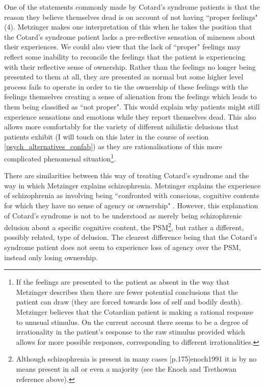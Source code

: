 One of the statements commonly made by Cotard's syndrome patients is that the reason they believe themselves dead is on account of not having ``proper feelings" (4). Metzinger makes one interpretation of this when he takes the position that the Cotard's syndrome patient lacks a pre-reflective sensation of mineness about their experiences. We could also view that the lack of ``proper" feelings may reflect some inability to reconcile the feelings that the patient is experiencing with their reflective sense of ownership. Rather than the feelings no longer being presented to them at all, they are presented as normal but some higher level process fails to operate in order to tie the ownership of these feelings with the feelings themselves creating a sense of alienation from the feelings which leads to them being classified as ``not proper". This would explain why patients might still experience sensations and emotions while they report themselves dead. This also allows more comfortably for the variety of different nihilistic delusions that patients exhibit (I will touch on this later in the course of section \ref{psych_alternatives_confab}) as they are rationalisations of this more complicated phenomenal situation\footnote{If the feelings are presented to the patient as absent in the way that Metzinger describes then there are fewer potential conclusions that the patient can draw (they are forced towards loss of self and bodily death). Metzinger believes that the Cotardian patient is making a rational response to unusual stimulus. On the current account there seems to be a degree of irrationality in the patient's response to the raw stimulus provided which allows for more possible responses, corresponding to different irrationalities.}.

There are similarities between this way of treating Cotard's syndrome and the way in which Metzinger explains schizophrenia. Metzinger explains the experience of schizophrenia as involving being ``confronted with conscious, cognitive contents for which they have no sense of agency or ownership" \cite[p. 445]{metzinger2003}. However, this explanation of Cotard's syndrome is not to be understood as merely being schizophrenic delusion about a specific cognitive content, the PSM\footnote{Although schizophrenia is present in many cases \cite[p. 185]{berrios1995b}[p.175]{enoch1991} it is by no means present in all or even a majority (see the Enoch and Trethowan reference above).}, but rather a different, possibly related, type of delusion. The clearest difference being that the Cotard's syndrome patient does not seem to experience loss of agency over the PSM, instead only losing ownership.


